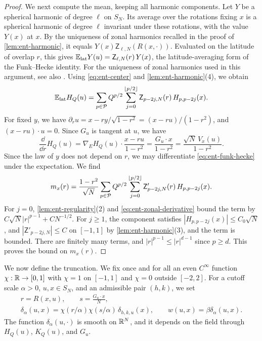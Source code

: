 \begin{proof}
We next compute the mean, keeping all harmonic components. Let $Y$ be a
spherical harmonic of degree $\ell$ on $S_N$. Its average over the rotations
fixing $x$ is a spherical harmonic of degree $\ell$ invariant under these
rotations, with the value $Y(x)$ at $x$. By the uniqueness of zonal
harmonics recalled in the proof of \cref{lem:ent-harmonic}, it equals
$Y(x)\mathsf Z_{\ell,N}(R(x,\cdot))$. Evaluated on the latitude of overlap
$r$, this gives $\mathbb E_{\rm lat}Y(u)=\mathsf Z_{\ell,N}(r)\,Y(x)$, the
latitude-averaging form of the Funk--Hecke identity. For the uniqueness of
zonal harmonics used in this argument, see also
\cite[Theorem~2.8, pp.~19--20]{AtkinsonHan2012}.
Using \eqref{eq:ent-center} and \cref{lem:ent-harmonic}(4), we obtain
\begin{equation}\label{eq:ent-funk-hecke}
 \mathbb E_{\rm lat}H_Q(u)=\sum_{p\in\mathcal P}Q^{p/2}\sum_{j=0}^{\lfloor p/2\rfloor}
 \mathsf Z_{p-2j,N}(r)\,H_{p,p-2j}(x).
\end{equation}
For fixed $y$, we have $\partial_ru=x-ry/\sqrt{1-r^2}=(x-ru)/(1-r^2)$, and
$(x-ru)\cdot u=0$. Since $G_u$ is tangent at $u$, we have
\[
 \frac{\dd}{\dd r}H_Q(u)=\nabla_EH_Q(u)\cdot\frac{x-ru}{1-r^2}
 =\frac{G_u\cdot x}{1-r^2}=\frac{\sqrt N\,V_x(u)}{1-r^2}.
\]
Since the law of $y$ does not depend on $r$, we may differentiate
\eqref{eq:ent-funk-hecke} under the expectation. We find
\begin{equation}\label{eq:ent-latitude-mean}
 m_x(r)=\frac{1-r^2}{\sqrt N}\sum_{p\in\mathcal P}Q^{p/2}
 \sum_{j=0}^{\lfloor p/2\rfloor}\mathsf Z'_{p-2j,N}(r)\,H_{p,p-2j}(x).
\end{equation}
For $j=0$, \cref{lem:ent-regularity}(2) and \eqref{eq:ent-zonal-derivative}
bound the term by $C\sqrt N|r|^{p-1}+CN^{-1/2}$. For $j\ge1$, the component
satisfies $|H_{p,p-2j}(x)|\le C_0\sqrt N$, and $|\mathsf Z'_{p-2j,N}|\le C$ on
$[-1,1]$ by \cref{lem:ent-harmonic}(3), and the term is bounded. There are
finitely many terms, and $|r|^{p-1}\le|r|^{d-1}$ since $p\ge d$. This proves
the bound on $m_x(r)$.
\end{proof}

We now define the truncation. We fix once and for all an even
$C^\infty$ function $\chi:\mathbb R\to[0,1]$ with $\chi=1$ on $[-1,1]$ and $\chi=0$
outside $[-2,2]$. For a cutoff scale $\alpha>0$, $u,x\in S_N$, and an
admissible pair $(h,k)$, we set
\begin{equation}\label{eq:ent-cutoff}
 \begin{gathered}
 r=R(x,u),\qquad s=\frac{G_u\cdot x}{N},\\
 \delta_\alpha(u,x)=\chi(r/\alpha)\chi(s/\alpha)\,\delta_{h,k,u}(x),\qquad
 w(u,x)=\beta\delta_\alpha(u,x).
 \end{gathered}
\end{equation}
The function $\delta_\alpha(u,\cdot)$ is smooth on $\mathbb R^N$, and it depends on
the field through $H_Q(u)$, $K_Q(u)$, and $G_u$.

